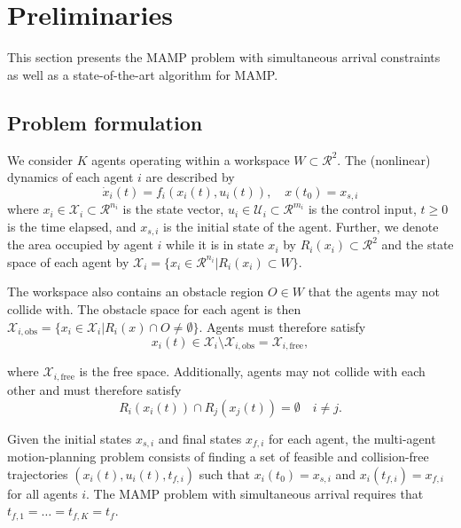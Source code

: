 \documentclass[letterpaper, 10 pt, conference]{ieeeconf}  %
\begin{document}
\section{Preliminaries}

This section presents the MAMP problem with simultaneous arrival constraints as well as a state-of-the-art algorithm for MAMP.

\subsection{Problem formulation}

We consider $K$ agents operating within a workspace $W \subset \mathcal{R}^2$. The (nonlinear) dynamics of each agent $i$ are described by
\begin{equation}
\dot{x}_i(t) = f_i(x_i(t), u_i(t)), \quad x(t_0) = x_{s, i}
\end{equation}
where $x_i \in \mathcal{X}_i \subset \mathcal{R}^{n_i}$ is the state vector, $u_i \in \mathcal{U}_i \subset \mathcal{R}^{m_i}$ is the control input, $t \geq 0$ is the time elapsed, and $x_{s, i}$ is the initial state of the agent. Further, we denote the area occupied by agent $i$ while it is in state $x_i$ by $R_i(x_i) \subset \mathcal{R}^2$ and the state space of each agent by $\mathcal{X}_i = \{x_i \in \mathcal{R}^{n_i} | R_i(x_i) \subset W\}$.

The workspace also contains an obstacle region $O \in W$ that the agents may not collide with. The obstacle space for each agent is then $\mathcal{X}_{i, \text{obs}} = \{x_i \in \mathcal{X}_i | R_i(x) \cap O \neq \emptyset \}$. Agents must therefore satisfy
\begin{equation}
x_i (t) \in \mathcal{X}_{i} \setminus \mathcal{X}_{i, \text{obs}} = \mathcal{X}_{i, \text{free}},
\end{equation}

\noindent where $\mathcal{X}_{i, \text{free}}$ is the free space. Additionally, agents may not collide with each other and must therefore satisfy
\begin{equation}
R_i(x_i(t)) \cap R_j(x_j(t)) = \emptyset \quad  i \neq j.
\end{equation}

Given the initial states $x_{s, i}$ and final states $x_{f, i}$ for each agent, the multi-agent motion-planning problem consists of finding a set of feasible and collision-free trajectories $(x_i(t), u_i(t), t_{f, i})$ such that $x_i(t_0) = x_{s, i}$ and $x_i(t_{f, i}) = x_{f, i}$ for all agents $i$. The MAMP problem with simultaneous arrival requires that $t_{f, 1} = \dots = t_{f, K} = t_f$.
\end{document}
